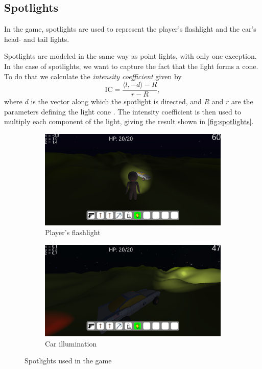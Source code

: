 \subsection{Spotlights}
In the game, spotlights are used to represent the player's flashlight and the car's head- and tail lights.

Spotlights are modeled in the same way as point lights, with only one exception.
In the case of spotlights, we want to capture the fact that the light forms a cone.
To do that we calculate the \textit{intensity coefficient} given by
\begin{equation*}
    \mathrm{IC} = \frac{\langle l, -d \rangle - R}{r - R},
\end{equation*}
where $d$ is the vector along which the spotlight is directed, and $R$ and $r$ are the parameters defining the light cone \cite{LearnOpenGL-Light-casters}.
The intensity coefficient is then used to multiply each component of the light, giving the result shown in \autoref{fig:spotlights}.
\begin{figure}[h]
    \centering
    \begin{subfigure}[b]{0.475\textwidth}
        \centering
        \includegraphics[width=\textwidth]{chapters/lighting/sections/lighting/resources/player-flashlight.png}
        \caption[]%
        {{\small Player's flashlight}}
        \label{fig:spotlight-player}
    \end{subfigure}
    \hfill
    \begin{subfigure}[b]{0.475\textwidth}
        \centering
        \includegraphics[width=\textwidth]{chapters/lighting/sections/lighting/resources/car-lights-spot.png}
        \caption[]%
        {{\small Car illumination}}
        \label{fig:spotlight-car}
    \end{subfigure}
    \caption[]
    {\small Spotlights used in the game}
    \label{fig:spotlights}
\end{figure}